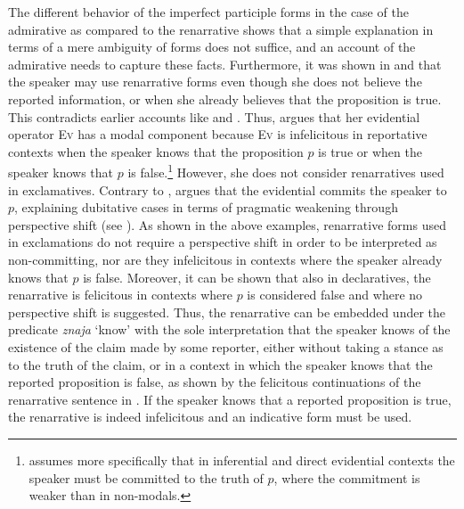 \documentclass[output=paper]{langscibook}
\begin{document}
\noindent The different behavior of the imperfect participle forms in the case of the admirative as compared to the renarrative shows that a simple explanation in terms of a mere ambiguity of forms
does not suffice, and an account of the admirative needs to capture these facts.
%
%
Furthermore, it was shown in  and  that the speaker may use renarrative forms even though she does not believe the reported information, or when she already believes that the proposition is true.
This contradicts earlier accounts like \citet{Smirnova2013} and \citet{Koev2017}. Thus, \citeauthor{Smirnova2013} argues that her evidential operator \textsc{Ev} has a modal component because \textsc{Ev} is infelicitous in reportative contexts when the speaker knows that the proposition $p$ is true or when the speaker knows that $p$ is false.\footnote{\citeauthor{Smirnova2013} assumes more specifically that in inferential and direct evidential contexts the speaker must be committed to the truth of $p$, where the commitment is weaker than in non-modals.} However, she does not consider renarratives used in exclamatives. Contrary to \citeauthor{Smirnova2013}, \citeauthor{Koev2017} argues that the evidential commits the speaker to $p$, explaining dubitative cases in terms of pragmatic weakening through perspective shift (see \citealt[20--25]{Koev2017}). As shown in the above examples, renarrative forms used in exclamations do not require a perspective shift in order to be interpreted as non-committing, nor are they infelicitous in contexts where the speaker already knows that $p$ is false. Moreover, it can be shown that also in declaratives, the renarrative is felicitous in contexts where $p$ is considered false and where no perspective shift is suggested. Thus, the renarrative can be embedded under the predicate \textit{znaja} `know' with the sole interpretation that the speaker knows of the existence of the claim made by some reporter, either without taking a stance as to the truth of the claim, or in a context in which the speaker knows that the reported proposition is false, as shown by the felicitous continuations of the renarrative sentence in . If the speaker knows that a reported proposition is true, the renarrative is indeed infelicitous and an indicative form must be used.\largerpage[-1]
\end{document}

